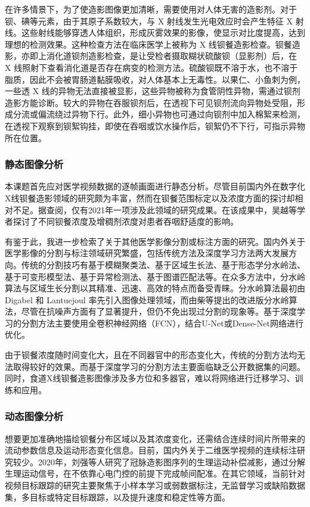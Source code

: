 在许多情景下，为了使造影图像更加清晰，需要使用对人体无害的造影剂。对于钡、碘等元素，由于其原子系数较大，与 X 射线发生光电效应时会产生特征 X 射线。这些射线能够穿透人体组织，形成灰雾效果的影像，使显示对比度提高，达到理想的检测效果。这种检查方法在临床医学上被称为 X 线钡餐造影检查。钡餐造影，亦即上消化道钡剂造影检查，是让受检者摄取糊状硫酸钡（显影剂）后，在 X 线照射下查看消化道是否存在病变的检测方法。硫酸钡既不溶于水，也不溶于脂质，因此不会被胃肠道黏膜吸收，对人体基本上无毒性。以果仁、小鱼刺为例，一些透 X 线的异物无法直接被显影，这些异物被称为食管阴性异物，需通过钡剂造影方能诊断。较大的异物在吞服钡剂后，在透视下可见钡剂流向异物处受阻，形成分流或偏流绕过异物下行。此外，细小异物也可通过向钡剂中加入棉絮来检测，在透视下观察到钡絮钩挂，即使在吞咽或饮水操作后，钡絮仍不下行，可指示异物所在位置。

\subsubsection{静态图像分析}

本课题首先应对医学视频数据的逐帧画面进行静态分析。尽管目前国内外在数字化X线钡餐造影领域的研究颇为丰富，然而在钡餐范围标定以及浓度方面的探讨却相对不足。据查阅，仅有2021年一项涉及此领域的研究成果。在该成果中，吴越等学者探讨了不同钡餐浓度及增稠剂浓度对患者吞咽舒适度的影响\cite{wu2021}。

有鉴于此，我进一步检索了关于其他医学影像分割或标注方面的研究。国内外关于医学影像的分割与标注领域研究繁盛，包括传统方法及深度学习方法两大发展方向。传统的分割技巧有基于模糊聚类法、基于区域生长法、基于形态学分水岭法、基于可变形模型法、基于异常检测法、基于图谱匹配法等。在众多方法中，分水岭算法与区域生长分割以其精准、迅速、高效的特点而备受青睐。分水岭算法最初由 Digabel 和 Lantuejoul 率先引入图像处理领域\cite{wang2009watershed}，而由柴\cite{chai2007watershed}等提出的改进版分水岭算法，尽管在抗噪声方面有了显著提升，但仍不免出现过分割的现象等。基于深度学习的分割方法主要使用全卷积神经网络（FCN），结合U-Net或Dense-Net网络进行优化。

由于钡餐浓度随时间变化大，且在不同器官中的形态变化大，传统的分割方法均无法取得较好的效果。而基于深度学习的分割方法主要面临缺乏公开数据集的问题。同时，食道X线钡餐造影图像涉及多方位和多器官，难以将网络进行迁移学习、训练和应用。

\subsubsection{动态图像分析}

想要更加准确地描绘钡餐分布区域以及其浓度变化，还需结合连续时间片所带来的流动参数信息及运动形态变化信息。目前，国内外关于二维医学视频的连续标注研究较少。2020年，刘强等人研究了冠脉造影图序列的生理运动补偿减影，通过分解生理运动信号，在不依靠心电门控的前提下完成帧间配准\cite{liu2020}。在其它领域，当前针对视频目标跟踪的研究主要聚焦于小样本学习或弱数据标注，无监督学习或缺陷数据集，多目标或特定目标跟踪，以及提升速度和稳定性等方面。

